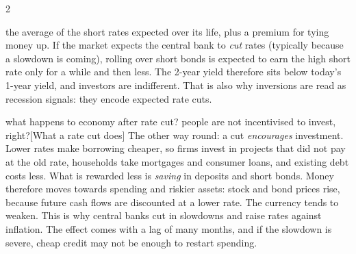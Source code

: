 \begin{paracol}{2}
\begin{answer}
the average of the short rates expected over its life, plus a premium for tying money up. If the market
expects the central bank to \emph{cut} rates (typically because a slowdown is coming), rolling over
short bonds is expected to earn the high short rate only for a while and then less. The 2-year yield
therefore sits below today's 1-year yield, and investors are indifferent. That is also why inversions
are read as recession signals: they encode expected rate cuts.
\end{answer}\begin{answer}{what happens to economy after rate cut? people are not incentivised to invest, right?}[What a rate cut does]
The other way round: a cut \emph{encourages} investment. Lower rates make borrowing cheaper, so firms
invest in projects that did not pay at the old rate, households take mortgages and consumer loans,
and existing debt costs less. What is rewarded less is \emph{saving} in deposits and short bonds.
Money therefore moves towards spending and riskier assets: stock and bond prices rise, because future
cash flows are discounted at a lower rate. The currency tends to weaken. This is why central banks cut
in slowdowns and raise rates against inflation. The effect comes with a lag of many months, and if
the slowdown is severe, cheap credit may not be enough to restart spending.
\end{answer}


\end{paracol}
